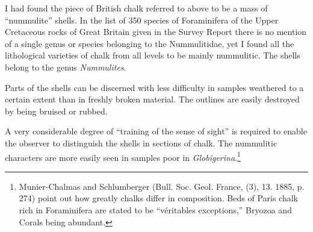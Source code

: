 \documentclass[a4paper, 12pt, oneside, landscape]{article}
\begin{document}
I had found the piece of British chalk referred to above to be a mass of ``nummulite'' shells. In the list of 350 species of Foraminifera of the Upper Cretaceous rocks of Great Britain given in the Survey Report there is no mention of a single genus or species belonging to the Nummulitidae, yet I found all the lithological varieties of chalk from all levels to be mainly nummulitic. The shells belong to the genus \emph{Nummulites}.

Parts of the shells can be discerned with less difficulty in samples weathered to a certain extent than in freshly broken material. The outlines are easily destroyed by being bruised or rubbed.

A very considerable degree of ``training of the sense of sight'' is required to enable the observer to distinguish the shells in sections of chalk. The nummulitic characters are more easily seen in samples poor in \emph{Globigerina}.\footnote{Munier-Chalmas and Schlumberger (Bull. Soc. Geol. France, (3), 13. 1885, p. 274) point out how greatly chalks differ in composition. Beds of Paris chalk rich in Foraminifera are stated to be ``véritables exceptions,'' Bryozoa and Corals being abundant.}
\end{document}
